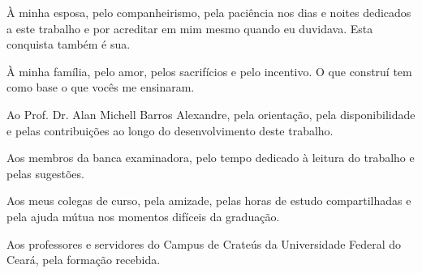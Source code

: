 À minha esposa, pelo companheirismo, pela paciência nos dias e noites dedicados a este trabalho e por acreditar em mim mesmo quando eu duvidava. Esta conquista também é sua.

À minha família, pelo amor, pelos sacrifícios e pelo incentivo. O que construí tem como base o que vocês me ensinaram.

Ao Prof. Dr. Alan Michell Barros Alexandre, pela orientação, pela disponibilidade e pelas contribuições ao longo do desenvolvimento deste trabalho.

Aos membros da banca examinadora, pelo tempo dedicado à leitura do trabalho e pelas sugestões.

Aos meus colegas de curso, pela amizade, pelas horas de estudo compartilhadas e pela ajuda mútua nos momentos difíceis da graduação.

Aos professores e servidores do Campus de Crateús da Universidade Federal do Ceará, pela formação recebida.
